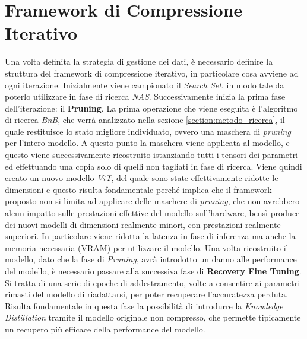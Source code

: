 \section{Framework di Compressione Iterativo}
Una volta definita la strategia di gestione dei dati, è necessario definire la struttura del framework di compressione iterativo, in particolare cosa avviene ad ogni iterazione. \newline
Inizialmente viene campionato il \textit{Search Set}, in modo tale da poterlo utilizzare in fase di ricerca \textit{NAS}. Successivamente inizia la prima fase dell'iterazione: il \textbf{Pruning}. La prima operazione che viene eseguita è l'algoritmo di ricerca \textit{BnB}, che verrà analizzato nella sezione \ref{section:metodo_ricerca}, il quale restituisce lo stato migliore individuato, ovvero una maschera di \textit{pruning} per l'intero modello. \newline
A questo punto la maschera viene applicata al modello, e questo viene successivamente ricostruito istanziando tutti i tensori dei parametri ed effettuando una copia solo di quelli non tagliati in fase di ricerca. Viene quindi creato un nuovo modello \textit{ViT}, del quale sono state effettivamente ridotte le dimensioni e questo risulta fondamentale perché implica che il framework proposto non si limita ad applicare delle maschere di \textit{pruning}, che non avrebbero alcun impatto sulle prestazioni effettive del modello sull'hardware, bensì produce dei nuovi modelli di dimensioni realmente minori, con prestazioni realmente superiori. In particolare viene ridotta la latenza in fase di inferenza ma anche la memoria necessaria (VRAM) per utilizzare il modello. \newline
Una volta ricostruito il modello, dato che la fase di \textit{Pruning}, avrà introdotto un danno alle performance del modello, è necessario passare alla successiva fase di \textbf{Recovery Fine Tuning}. Si tratta di una serie di epoche di addestramento, volte a consentire ai parametri rimasti del modello di riadattarsi, per poter recuperare l'accuratezza perduta. Risulta fondamentale in questa fase la possibilità di introdurre la \textit{Knowledge Distillation} tramite il modello originale non compresso, che permette tipicamente un recupero più efficace della performance del modello. \newline
